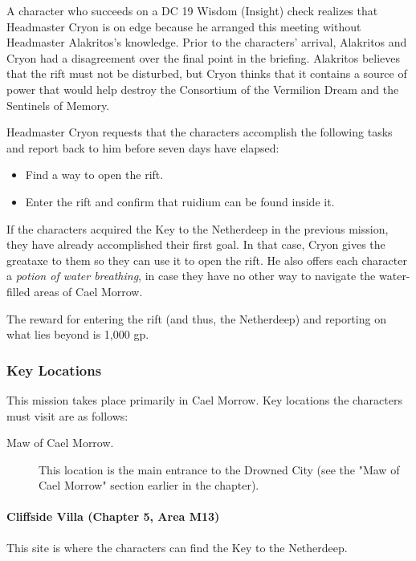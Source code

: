 \documentclass[a4paper, 11pt, bg=full, twocolumn, nooutline]{dndbook}
\begin{document}
A character who succeeds on a DC 19 Wisdom (Insight) check realizes that Headmaster Cryon is on edge because he arranged this meeting without Headmaster Alakritos's knowledge. Prior to the characters' arrival, Alakritos and Cryon had a disagreement over the final point in the briefing. Alakritos believes that the rift must not be disturbed, but Cryon thinks that it contains a source of power that would help destroy the Consortium of the Vermilion Dream and the Sentinels of Memory.

Headmaster Cryon requests that the characters accomplish the following tasks and report back to him before seven days have elapsed:

\begin{itemize}
\item Find a way to open the rift.
\item Enter the rift and confirm that ruidium can be found inside it.
\end{itemize}

If the characters acquired the Key to the Netherdeep in the previous mission, they have already accomplished their first goal. In that case, Cryon gives the greataxe to them so they can use it to open the rift. He also offers each character a \textit{potion of water breathing}, in case they have no other way to navigate the water-filled areas of Cael Morrow.

The reward for entering the rift (and thus, the Netherdeep) and reporting on what lies beyond is 1,000 gp.

\subsubsection{Key Locations}

This mission takes place primarily in Cael Morrow. Key locations the characters must visit are as follows:

\begin{description}
\item[Maw of Cael Morrow.] This location is the main entrance to the Drowned City (see the "Maw of Cael Morrow" section earlier in the chapter).
\end{description}

\paragraph{Cliffside Villa (Chapter 5, Area M13)}

This site is where the characters can find the Key to the Netherdeep.
\end{document}
